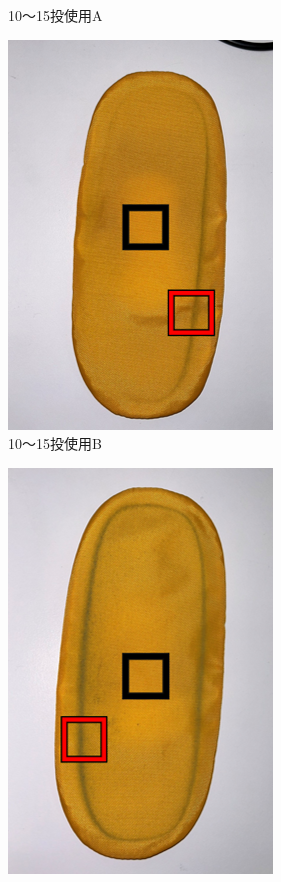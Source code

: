 \documentclass[main]{subfiles}
\begin{document}
\begin{figure}[htbp]
\begin{subfigure}[htbp]{0.3\linewidth}
        \caption{10～15投使用A}
        \label{fig:labelB}
    \end{subfigure}
    \begin{subfigure}[htbp]{0.3\linewidth}
        \centering
        \includegraphics[keepaspectratio, width=0.8\linewidth, height=\linewidth]{figures/caring_brush_pad/10~15B.png}
        \caption{10～15投使用B}
        \label{fig:labelC}
    \end{subfigure}
    \begin{subfigure}[htbp]{0.3\linewidth}
        \centering
        \includegraphics[keepaspectratio, width=0.8\linewidth, height=\linewidth]{figures/caring_brush_pad/chouki.png}

\end{subfigure}
\end{figure}
\end{document}
